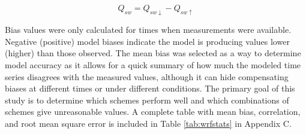 \begin{equation}\label{eq:netswflux}
Q_{sw} = Q_{sw \downarrow} - Q_{sw \uparrow}
\end{equation}

 Bias values were only calculated for times when measurements were available. Negative (positive) model biases indicate the model is producing values lower (higher) than those observed. The mean bias was selected as a way to determine model accuracy as it allows for a quick summary of how much the modeled time series disagrees with the measured values, although it can hide compensating biases at different times or under different conditions. The primary goal of this study is to determine which schemes perform well and which combinations of schemes give unreasonable values. A complete table with mean bias, correlation, and root mean square error is included in Table \ref{tab:wrfstats} in Appendix C. 

